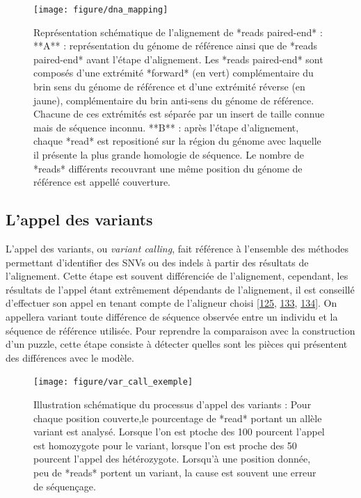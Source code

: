 \documentclass[12pt,twoside]{ugathesis}
\theoremstyle{definition}
\theoremstyle{definition}
\theoremstyle{remark}
\begin{document}
\begin{figure}

{\centering \texttt{[image: figure/dna\_mapping]} 

}

\caption[Représentation schématique de l'alignement de *reads paired-end*]{Représentation schématique de l'alignement de *reads paired-end* : **A** : représentation du génome de référence ainsi que de *reads paired-end* avant l'étape d'alignement. Les *reads paired-end* sont composés d'une extrémité *forward* (en vert) complémentaire du brin sens du génome de référence et d'une extrémité réverse (en jaune), complémentaire du brin anti-sens du génome de référence. Chacune de ces extrémités est séparée par un insert de taille connue mais de séquence inconnu. **B** : après l'étape d'alignement, chaque *read* est repositioné sur la région du génome avec laquelle il présente la plus grande homologie de séquence. Le nombre de *reads* différents recouvrant une même position du génome de référence est appellé couverture.}\label{fig:picdnamapping}
\end{figure}

\newpage

\subsection{L'appel des variants}\label{varcall}

L'appel des variants, ou \emph{variant calling}, fait référence à
l'ensemble des méthodes permettant d'identifier des SNVs ou des indels à
partir des résultats de l'alignement. Cette étape est souvent
différenciée de l'alignement, cependant, les résultats de l'appel étant
extrêmement dépendants de l'alignement, il est conseillé d'effectuer son
appel en tenant compte de l'aligneur choisi
{[}\protect\hyperlink{ref-Nielsen2011}{125},
\protect\hyperlink{ref-DePristo2011}{133},
\protect\hyperlink{ref-Lunter2011}{134}{]}. On appellera variant toute
différence de séquence observée entre un individu et la séquence de
référence utilisée. Pour reprendre la comparaison avec la construction
d'un puzzle, cette étape consiste à détecter quelles sont les pièces qui
présentent des différences avec le modèle.

\begin{figure}

{\centering \texttt{[image: figure/var\_call\_exemple]} 

}

\caption[Illustration schématique du processus d'appel des variants]{Illustration schématique du processus d'appel des variants : Pour chaque position couverte,le pourcentage de *read* portant un allèle variant est analysé. Lorsque l'on est ptoche des 100 pourcent l'appel est homozygote pour le variant, lorsque l'on est proche des 50 pourcent l'appel des hétérozygote. Lorsqu'à une position donnée, peu de *reads* portent un variant, la cause est souvent une erreur de séquençage.}\label{fig:picvarcallprocess}
\end{figure}
\end{document}
